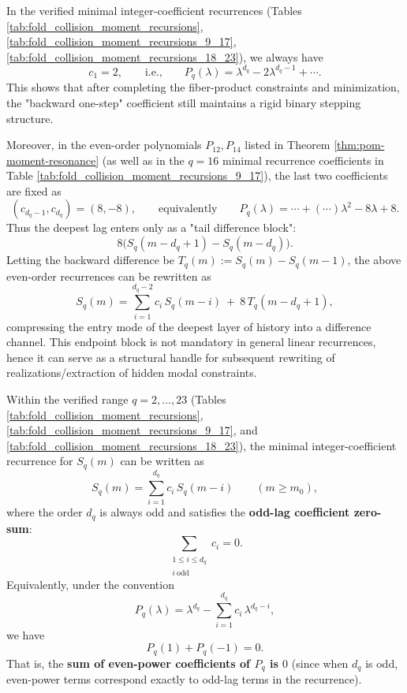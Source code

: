 




\begin{remark}\label{rem:pom-recurrence-endpoint-rigidity}
In the verified minimal integer-coefficient recurrences (Tables \ref{tab:fold_collision_moment_recursions}, \ref{tab:fold_collision_moment_recursions_9_17}, \ref{tab:fold_collision_moment_recursions_18_23}), we always have
\[
c_1=2,
\qquad\text{i.e.,}\qquad
P_q(\lambda)=\lambda^{d_q}-2\lambda^{d_q-1}+\cdots.
\]
This shows that after completing the fiber-product constraints and minimization, the "backward one-step" coefficient still maintains a rigid binary stepping structure.
\par
Moreover, in the even-order polynomials \(P_{12},P_{14}\) listed in Theorem \ref{thm:pom-moment-resonance} (as well as in the \(q=16\) minimal recurrence coefficients in Table \ref{tab:fold_collision_moment_recursions_9_17}), the last two coefficients are fixed as
\[
(c_{d_q-1},c_{d_q})=(8,-8),
\qquad\text{equivalently}\qquad
P_q(\lambda)=\cdots+(\cdots)\lambda^2-8\lambda+8.
\]
Thus the deepest lag enters only as a "tail difference block":
\[
8\bigl(S_q(m-d_q+1)-S_q(m-d_q)\bigr).
\]
Letting the backward difference be \(T_q(m):=S_q(m)-S_q(m-1)\), the above even-order recurrences can be rewritten as
\[
S_q(m)=\sum_{i=1}^{d_q-2}c_i\,S_q(m-i)\ +\ 8\,T_q(m-d_q+1),
\]
compressing the entry mode of the deepest layer of history into a difference channel.
This endpoint block is not mandatory in general linear recurrences, hence it can serve as a structural handle for subsequent rewriting of realizations/extraction of hidden modal constraints.
\end{remark}

\begin{proposition}\label{prop:pom-moment-odd-lag-neutrality}
Within the verified range \(q=2,\dots,23\) (Tables \ref{tab:fold_collision_moment_recursions}, \ref{tab:fold_collision_moment_recursions_9_17}, and \ref{tab:fold_collision_moment_recursions_18_23}), the minimal integer-coefficient recurrence for \(S_q(m)\) can be written as
\[
S_q(m)=\sum_{i=1}^{d_q} c_i\,S_q(m-i)\qquad(m\ge m_0),
\]
where the order \(d_q\) is always odd and satisfies the \textbf{odd-lag coefficient zero-sum}:
\[
\sum_{\substack{1\le i\le d_q\\ i\ \mathrm{odd}}} c_i=0.
\]
Equivalently, under the convention
\[
P_q(\lambda)=\lambda^{d_q}-\sum_{i=1}^{d_q}c_i\,\lambda^{d_q-i},
\]
we have
\[
P_q(1)+P_q(-1)=0.
\]
That is, the \textbf{sum of even-power coefficients of \(P_q\) is \(0\)} (since when \(d_q\) is odd, even-power terms correspond exactly to odd-lag terms in the recurrence).
\end{proposition}

